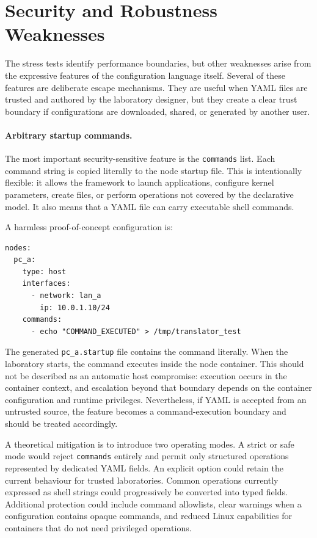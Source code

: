 \section{Security and Robustness Weaknesses}
\label{sec:translator-weaknesses}

The stress tests identify performance boundaries, but other weaknesses arise
from the expressive features of the configuration language itself. Several of
these features are deliberate escape mechanisms. They are useful when YAML
files are trusted and authored by the laboratory designer, but they create a
clear trust boundary if configurations are downloaded, shared, or generated by
another user.

\paragraph{Arbitrary startup commands.}
The most important security-sensitive feature is the \texttt{commands} list.
Each command string is copied literally to the node startup file. This is
intentionally flexible: it allows the framework to launch applications,
configure kernel parameters, create files, or perform operations not covered
by the declarative model. It also means that a YAML file can carry executable
shell commands.

A harmless proof-of-concept configuration is:

\begin{lstlisting}[caption={Benign demonstration of command execution through a startup entry.},
label={lst:command-execution-example}]
nodes:
  pc_a:
    type: host
    interfaces:
      - network: lan_a
        ip: 10.0.1.10/24
    commands:
      - echo "COMMAND_EXECUTED" > /tmp/translator_test
\end{lstlisting}

The generated \texttt{pc\_a.startup} file contains the command literally. When
the laboratory starts, the command executes inside the node container. This
should not be described as an automatic host compromise: execution occurs in
the container context, and escalation beyond that boundary depends on the
container configuration and runtime privileges. Nevertheless, if YAML is
accepted from an untrusted source, the feature becomes a command-execution
boundary and should be treated accordingly.

A theoretical mitigation is to introduce two operating modes. A strict or
safe mode would reject \texttt{commands} entirely and permit only structured
operations represented by dedicated YAML fields. An explicit
 option could retain the current behaviour for trusted
laboratories. Common operations currently expressed as shell strings could
progressively be converted into typed fields. Additional protection could
include command allowlists, clear warnings when a configuration contains
opaque commands, and reduced Linux capabilities for containers that do not
need privileged operations.


